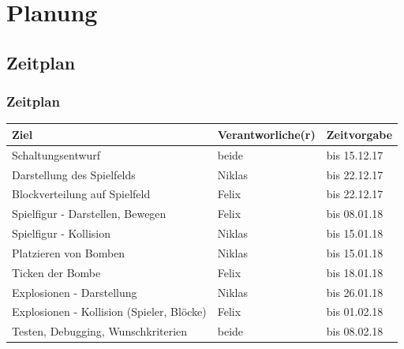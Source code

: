 \documentclass[18pt]{beamer}
\begin{document}
	\section{Planung}
		\subsection{Zeitplan}
		\begin{frame}
			\frametitle{Zeitplan}
			\begin{table}[H]
				\centering
				\label{my-label}
				\begin{tabular}{l|l|l}
					Ziel                                      & Verantworliche(r) & Zeitvorgabe  \\
					\hline
					Schaltungsentwurf                         & beide           & bis 15.12.17 \\
					Darstellung des Spielfelds                & Niklas          & bis 22.12.17 \\
					Blockverteilung auf Spielfeld             & Felix           & bis 22.12.17 \\
					Spielfigur - Darstellen, Bewegen          & Felix           & bis 08.01.18 \\
					Spielfigur - Kollision                    & Niklas          & bis 15.01.18 \\
					Platzieren von Bomben                     & Niklas          & bis 15.01.18 \\
					Ticken der Bombe                          & Felix           & bis 18.01.18 \\
					Explosionen - Darstellung                 & Niklas          & bis 26.01.18 \\
					Explosionen - Kollision (Spieler, Blöcke) & Felix           & bis 01.02.18 \\
					Testen, Debugging, Wunschkriterien        & beide           & bis 08.02.18
				\end{tabular}
			\end{table}
		\end{frame}
		
\end{document}
